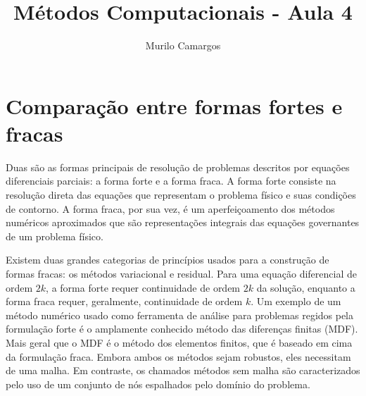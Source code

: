 \documentclass[10pt,a4paper]{article}
\author{Murilo Camargos}
\title{Métodos Computacionais - Aula 4}
\begin{document}

	\section{Comparação entre formas fortes e fracas}

	Duas são as formas principais de resolução de problemas descritos por equações diferenciais parciais: a forma forte e a forma fraca. A forma forte consiste na resolução direta das equações que representam o problema físico e suas condições de contorno. A forma fraca, por sua vez, é um aperfeiçoamento dos métodos numéricos aproximados que são representações integrais das equações governantes de um problema físico.
	
	Existem duas grandes categorias de princípios usados para a construção de formas fracas: os métodos variacional e residual. Para uma equação diferencial de ordem $2k$, a forma forte requer continuidade de ordem $2k$ da solução, enquanto a forma fraca requer, geralmente, continuidade de ordem $k$. Um exemplo de um método numérico usado como ferramenta de análise para problemas regidos pela formulação forte é o amplamente conhecido método das diferenças finitas (MDF). Mais geral que o MDF é o método dos elementos finitos, que é baseado em cima da formulação fraca. Embora ambos os métodos sejam robustos, eles necessitam de uma malha. Em contraste, os chamados métodos sem malha são caracterizados pelo uso de um conjunto de nós espalhados pelo domínio do problema.
\end{document}
